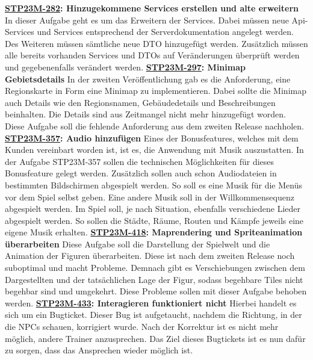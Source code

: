 \textbf{\hyperlink{T282}{\hypertarget{S282}{STP23M-282}}: Hinzugekommene Services erstellen und alte erweitern}
\newline
\newline
In dieser Aufgabe geht es um das Erweitern der Services. Dabei müssen neue Api-Services und Services entsprechend der Serverdokumentation angelegt werden. Des Weiteren müssen sämtliche neue \Gls{DTO} hinzugefügt werden. Zusätzlich müssen alle bereits vorhanden Services und DTOs auf Veränderungen überprüft werden und gegebenenfalls verändert werden.
\newline
\newline
\textbf{\hyperlink{T297}{\hypertarget{S297}{STP23M-297}}: Minimap Gebietsdetails}
\newline
\newline
In der zweiten Veröffentlichung gab es die Anforderung, eine Regionskarte in Form eine Minimap zu implementieren. Dabei sollte die Minimap auch Details wie den Regionsnamen, Gebäudedetails und Beschreibungen beinhalten. Die Details sind aus Zeitmangel nicht mehr hinzugefügt worden. Diese Aufgabe soll die fehlende Anforderung aus dem zweiten Release nachholen.
\newline
\newline
\textbf{\hyperlink{T357}{\hypertarget{S357}{STP23M-357}}: Audio hinzufügen}
\newline
\newline
Eines der Bonusfeatures, welches mit dem Kunden vereinbart worden ist, ist es, die Anwendung mit Musik auszustatten. In der Aufgabe STP23M-357 sollen die technischen Möglichkeiten für dieses Bonusfeature gelegt werden. Zusätzlich sollen auch schon Audiodateien in bestimmten Bildschirmen abgespielt werden. So soll es eine Musik für die Menüs vor dem Spiel selbst geben. Eine andere  Musik soll in der Willkommensequenz abgespielt werden. Im Spiel soll, je nach Situation, ebenfalls verschiedene Lieder abgespielt werden. So sollen die Städte, Räume, Routen und Kämpfe jeweils eine eigene Musik erhalten.
\newline
\newline
\textbf{\hyperlink{T418}{\hypertarget{S418}{STP23M-418}}: Maprendering und Spriteanimation überarbeiten}
\newline
\newline
Diese Aufgabe soll die Darstellung der Spielwelt und die Animation der Figuren überarbeiten. Diese ist nach dem zweiten Release noch suboptimal und macht Probleme. Demnach gibt es Verschiebungen zwischen dem Dargestellten und der tatsächlichen Lage der Figur, sodass begehbare Tiles nicht begehbar sind und umgekehrt. Diese Probleme sollen mit dieser Aufgabe behoben werden.
\newline
\newline
\textbf{\hyperlink{T433}{\hypertarget{S433}{STP23M-433}}: Interagieren funktioniert nicht}
\newline
\newline
Hierbei handelt es sich um ein Bugticket. Dieser Bug ist aufgetaucht, nachdem die Richtung, in der die NPCs schauen, korrigiert wurde. Nach der Korrektur ist es nicht mehr möglich, andere Trainer anzusprechen. Das Ziel dieses Bugtickets ist es nun dafür zu sorgen, dass das Ansprechen wieder möglich ist.

